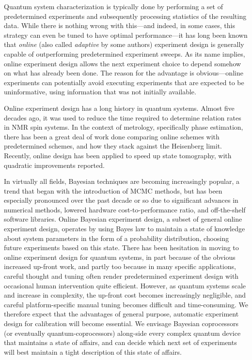 \documentclass[aps,nofootinbib,twocolumn,superscriptaddress]{revtex4}
\begin{document}
Quantum system characterization is typically done by performing 
a set of predetermined experiments and subsequently processing 
statistics of the resulting data.
While there is nothing wrong with this---and indeed, in some cases,
this strategy can even be tuned to have optimal performance---it
has long been known that \textit{online} 
(also called \textit{adaptive} by some authors)
experiment design is generally 
capable of outperforming predetermined experiment sweeps.
As its name implies, online experiment design allows the next experiment 
choice to depend somehow on what has already been done.
The reason for the advantage is obvious---online 
experiments can potentially avoid executing experiments that 
are expected to be uninformative, using information that was 
not initially available.

Online experiment design has a long history in quantum systems.
Almost five decades ago, it was used to reduce the time required to 
determine relation rates in NMR spin systems.
In the context of metrology, specifically phase estimation, 
there has been a great deal of 
work done comparing online schemes with predetermined schemes,
and how they stack against the Heisenberg limit.
Recently, online design has been applied to speed up state tomography, 
with quadratic improvements reported.

In virtually all fields,
Bayesian techniques are becoming increasingly popular, a trend that began 
with the introduction of MCMC methods, but has been especially pronounced 
over the past 
decade or so due to significant advances in numerical methods, lowered
hardware cost-to-performance ratio, and off-the-shelf software libraries.
Online Bayesian experiment design, a subset of general online 
experiment design, operates by using Bayes law to maintain 
a state of knowledge about system parameters in the form of 
a probability distribution, choosing future experiments based on this state.
There has been hesitation in moving to online experiment design for 
quantum systems, in part because of the obvious increased up-front work,
and partly too because in many specific applications, careful 
thought and tuning 
often render predetermined experiment design with occasional 
human intervention quite efficient.
However, as quantum systems scale and increase in complexity, the 
up-front cost becomes increasingly negligible, and careful
platform-specific manual tuning becomes difficult and time-consuming.
We therefore expect 
that the advantages of general purpose, automatic experiment design for calibration will become essential.
We envisage Bayesian coprocessors (or eventually quantum-coprocessors) 
along-side every complex quantum device that maintains a state of affairs,
and can decide which next set of experiments will best maintain a tight
description of this state of affairs.
\end{document}
